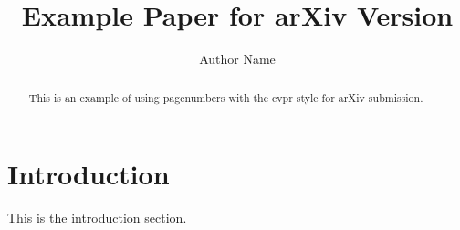 \documentclass{article}
\begin{document}
\title{Example Paper for arXiv Version}
\author{Author Name}
\maketitle

\begin{abstract}
This is an example of using pagenumbers with the cvpr style for arXiv submission.
\end{abstract}


\section{Introduction}
This is the introduction section.
\end{document}
